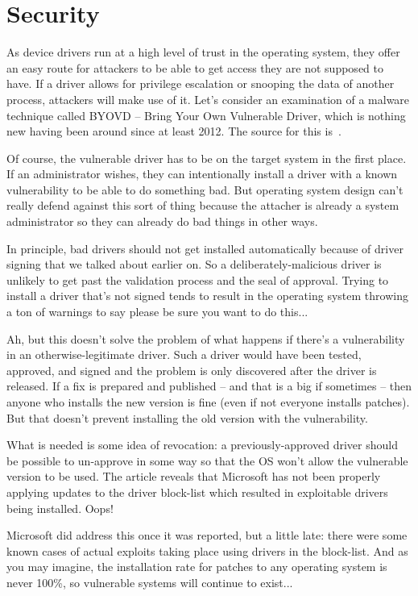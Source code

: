 \section*{Security}
As device drivers run at a high level of trust in the operating system, they offer an easy route for attackers to be able to get access they are not supposed to have. If a driver allows for privilege escalation or snooping the data of another process, attackers will make use of it. Let's consider an examination of a malware technique called BYOVD -- Bring Your Own Vulnerable Driver, which is nothing new having been around since at least 2012. The source for this is~\cite{byovd}.

Of course, the vulnerable driver has to be on the target system in the first place. If an administrator wishes, they can intentionally install a driver with a known vulnerability to be able to do something bad. But operating system design can't really defend against this sort of thing because the attacher is already a system administrator so they can already do bad things in other ways. 

In principle, bad drivers should not get installed automatically because of driver signing that we talked about earlier on. So a deliberately-malicious driver is unlikely to get past the validation process and the seal of approval. Trying to install a driver that's not signed tends to result in the operating system throwing a ton of warnings to say please be sure you want to do this...

Ah, but this doesn't solve the problem of what happens if there's a vulnerability in an otherwise-legitimate driver. Such a driver would have been tested, approved, and signed and the problem is only discovered after the driver is released. If a fix is prepared and published -- and that is a big if sometimes -- then anyone who installs the new version is fine (even if not everyone installs patches). But that doesn't prevent installing the old version with the vulnerability.

What is needed is some idea of revocation: a previously-approved driver should be possible to un-approve in some way so that the OS won't allow the vulnerable version to be used. The article reveals that Microsoft has not been properly applying updates to the driver block-list which resulted in exploitable drivers being installed. Oops!

Microsoft did address this once it was reported, but a little late: there were some known cases of actual exploits taking place using drivers in the block-list. And as you may imagine, the installation rate for patches to any operating system is never 100\%, so vulnerable systems will continue to exist...




